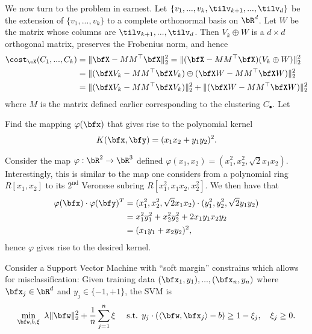 \begin{homework}[e]
\begin{prf}
\begin{enumerate}[(a)]
      We now turn to the problem in earnest. Let $\{v_1,...,v_k,\tilv_{k+1},...,\tilv_d\}$ be the extension of $\{v_1,...,v_k\}$ to a complete orthonormal basis on $\bR^d$. Let $W$ be the matrix whose columns are $\tilv_{k+1},...,\tilv_d$. Then $V_k\oplus W$ is a $d\times d$ orthogonal matrix, preserves the Frobenius norm, and hence
      \begin{align*}
        \cost_\cX(C_1,...,C_k) 
          &= \|\bfX - MM^\top\bfX\|^2_2 = \|(\bfX - MM^\top\bfX)(V_k\oplus W)\|^2_2 \\
          &= \|(\bfX V_k - MM^\top\bfX V_k) \oplus (\bfX W - MM^\top\bfX W)\|^2_2 \\
          &= \|(\bfX V_k - MM^\top\bfX V_k)\|^2_2 + \|(\bfX W - MM^\top \bfX W)\|^2_2
      \end{align*}
      where $M$ is the matrix defined earlier corresponding to the clustering $C_\bullet$. Let
    \end{enumerate}
  \end{prf}
   Find the mapping $\varphi(\bfx)$ that gives rise to the polynomial kernel \begin{align*}
    K(\bfx, \bfy) = (x_1x_2 + y_1y_2)^2.
  \end{align*}
  \begin{prf}
    Consider the map $\varphi:\bR^2 \to \bR^3$ defined $\varphi(x_1,x_2) = (x_1^2, x_2^2, \sqrt{2}x_1x_2)$. Interestingly, this is similar to the map one considers from a polynomial ring $R[x_1,x_2]$ to its $2^{\text{nd}}$ Veronese subring $R[x_1^2,x_1x_2,x_2^2]$. We then have that
    \begin{align*}
      \varphi(\bfx)\cdot \varphi(\bfy)^T
        &= (x_1^2,x_2^2,\sqrt{2}x_1x_2) \cdot (y_1^2,y_2^2, \sqrt{2}y_1y_2) \\
        &= x_1^2y_1^2 + x_2^2y_2^2 + 2x_1y_1x_2y_2 \\
        &= (x_1y_1 + x_2y_2)^2,
    \end{align*}
    hence $\varphi$ gives rise to the desired kernel.
  \end{prf}
   Consider a Support Vector Machine with ``soft margin'' constrains which allows for misclassification: Given training data $(\bfx_1,y_1),...,(\bfx_n,y_n)$ where $\bfx_j \in \bR^d$ and $y_j \in \{-1, +1\}$, the SVM is
  \begin{align*}
    \min_{\bfw, b,\xi} ~ \lambda\|\bfw\|^2_2 + \frac{1}{n}\sum_{j=1}^n \xi \hspace{1em} \text{ s.t. } y_j\cdot (\langle \bfw,\bfx_j \rangle - b)\geq 1 - \xi_j, \hspace{1em} \xi_j \geq 0.

\end{align*}
\end{homework}
